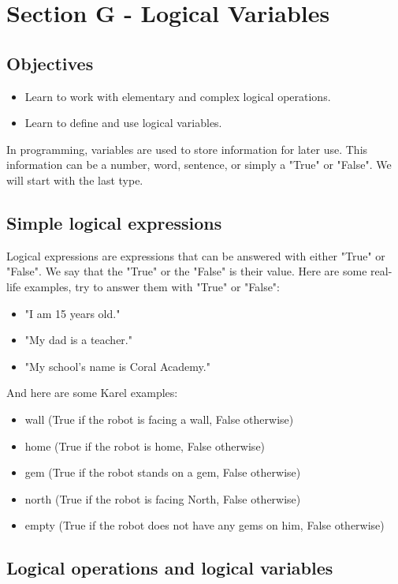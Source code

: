 \documentclass[article,A4,12pt]{llncs}
\begin{document}
{{{{\section{Section G - Logical Variables}

\subsection{Objectives} 
 
\begin{itemize}
\item Learn to work with elementary and complex logical operations.
\item Learn to define and use logical variables.
\end{itemize}

\noindent
In programming, variables are used to store information for later use. This information can 
be a number, word, sentence, or simply a "True" or "False". We will start
with the last type. 

\subsection{Simple logical expressions}
Logical expressions are expressions that can be answered with either "True" or 
"False". We say that the "True" or the "False" is their value. Here are some 
real-life examples, try to answer them with "True" or "False":

\begin{itemize}
\item "I am 15 years old."
\item "My dad is a teacher."
\item "My school's name is Coral Academy."
\end{itemize}
And here are some Karel examples:
\begin{itemize}
\item wall (True if the robot is facing a wall, False otherwise)
\item home (True if the robot is home, False otherwise)
\item gem (True if the robot stands on a gem, False otherwise)
\item north (True if the robot is facing North, False otherwise)
\item empty (True if the robot does not have any gems on him, False otherwise)
\end{itemize}

\subsection{Logical operations and logical variables}

}}}}
\end{document}
